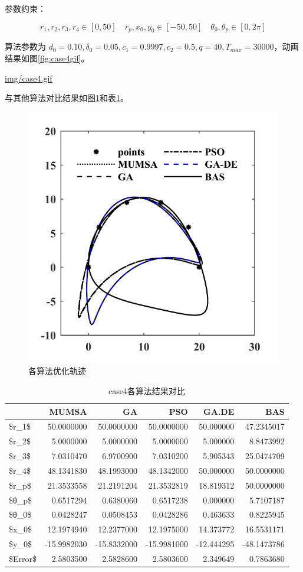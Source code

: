 \documentclass[]{ctexbook}
\theoremstyle{definition}
\theoremstyle{definition}
\theoremstyle{definition}
\theoremstyle{remark}
\begin{document}
参数约束：

\[
r_1,r_2,r_3,r_4\in[0,50]\quad r_p,x_0,y_0\in[-50,50]\quad \theta_0,\theta_p\in[0,2\pi]
\]

算法参数为
\(d_0 = 0.10,\delta_0=0.05,c_1=0.9997,c_2=0.5,q=40,T_{max}=30000\)，动画结果如图\ref{fig:case4gif}。

\url{img/case4.gif}

与其他算法对比结果如图\ref{fig:case4png}和表\ref{tab:case4table}。

\begin{figure}

{\centering \includegraphics[width=0.5\linewidth]{img/case4png} 

}

\caption{各算法优化轨迹}\label{fig:case4png}
\end{figure}

\begin{table}

\caption{\label{tab:case4table}case4各算法结果对比}
\centering
\begin{tabular}[t]{lrrrrr}
\toprule
  & MUMSA & GA & PSO & GA.DE & BAS\\
\midrule
\$r\_1\$ & 50.0000000 & 50.0000000 & 50.0000000 & 50.000000 & 47.2345017\\
\$r\_2\$ & 5.0000000 & 5.0000000 & 5.0000000 & 5.000000 & 8.8473992\\
\$r\_3\$ & 7.0310470 & 6.9700900 & 7.0310200 & 5.905343 & 25.0474709\\
\$r\_4\$ & 48.1341830 & 48.1993000 & 48.1342000 & 50.000000 & 50.0000000\\
\$r\_p\$ & 21.3533558 & 21.2191204 & 21.3532819 & 18.819312 & 50.0000000\\
\addlinespace
\$θ\_p\$ & 0.6517294 & 0.6380060 & 0.6517238 & 0.000000 & 5.7107187\\
\$θ\_0\$ & 0.0428247 & 0.0508453 & 0.0428286 & 0.463633 & 0.8225945\\
\$x\_0\$ & 12.1974940 & 12.2377000 & 12.1975000 & 14.373772 & 16.5531171\\
\$y\_0\$ & -15.9982030 & -15.8332000 & -15.9981000 & -12.444295 & -48.1473786\\
\$Error\$ & 2.5803500 & 2.5828600 & 2.5803600 & 2.349649 & 0.7863680\\
\bottomrule
\end{tabular}
\end{table}
\end{document}
